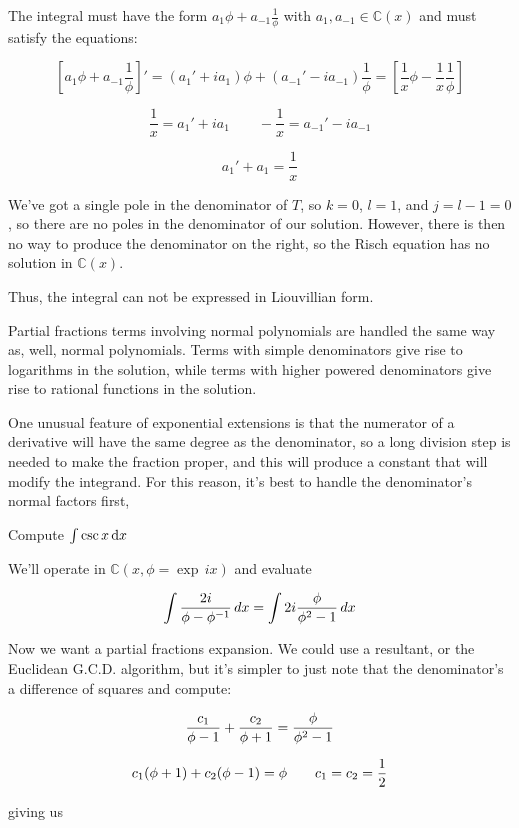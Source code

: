 The integral must have the form $a_1 \phi + a_{-1} \frac{1}{\phi}$
with $a_1, a_{-1} \in {\mathbb C}(x)$ and must satisfy the equations:

$$\left[ a_1 \phi + a_{-1}\frac{1}{\phi} \right]' = (a_1' + i a_1 ) \phi + (a_{-1}' - i a_{-1} ) \frac{1}{\phi}
= \left[ \frac{1}{x}\phi - \frac{1}{x}\frac{1}{\phi} \right]$$

$$\frac{1}{x} = a_1' + i a_1 \qquad - \frac{1}{x} = a_{-1}' - i a_{-1}$$

$$a_1' + a_1 = \frac{1}{x}$$

We've got a single pole in the denominator of $T$, so $k=0$, $l=1$,
and $j=l-1=0$, so there are no poles in the denominator of our solution.
However, there is then no way to produce the denominator on the
right, so the Risch equation has no solution in ${\mathbb C}(x)$.


Thus, the integral
can not be expressed in Liouvillian form.

\endexample

\vfil\eject

Partial fractions terms involving normal polynomials are handled the
same way as, well, normal polynomials.  Terms with simple denominators
give rise to logarithms in the solution, while terms with higher
powered denominators give rise to rational functions in the solution.

One unusual feature of exponential extensions is that the numerator of
a derivative will have the same degree as the denominator, so a long
division step is needed to make the fraction proper, and this will
produce a constant that will modify the integrand.  For this reason,
it's best to handle the denominator's normal factors first,


\example Compute $\int \csc x \, {\rm d}x$

We'll operate in ${\mathbb C}(x, \phi = \exp \,ix)$ and evaluate

$$\int {{2i}\over{\phi - \phi^{-1}}} \,dx = \int 2i {{\phi}\over{\phi^2 - 1}} \,dx$$

Now we want a partial fractions expansion.  We could use a resultant,
or the Euclidean G.C.D. algorithm, but it's simpler to just note that
the denominator's a difference of squares and compute:

$${{c_1}\over{\phi-1}} + {{c_2}\over{\phi+1}} = {{\phi}\over{\phi^2-1}} $$

$${{c_1}(\phi+1)} + {{c_2}(\phi-1)} = \phi \qquad c_1 = c_2 = {1\over2} $$

giving us

